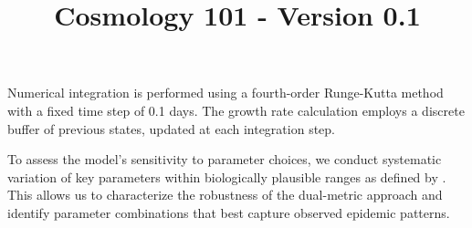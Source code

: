 \documentclass{article}\usepackage{graphicx} \usepackage{amsmath} \usepackage{colortbl}\title{Cosmology 101 - Version 0.1}
\begin{document}
Numerical integration is performed using a fourth-order Runge-Kutta method with a fixed time step of 0.1 days. The growth rate calculation employs a discrete buffer of previous states, updated at each integration step.

To assess the model's sensitivity to parameter choices, we conduct systematic variation of key parameters within biologically plausible ranges as defined by \citet{verelst2016behavioural}. This allows us to characterize the robustness of the dual-metric approach and identify parameter combinations that best capture observed epidemic patterns.
\end{document}
